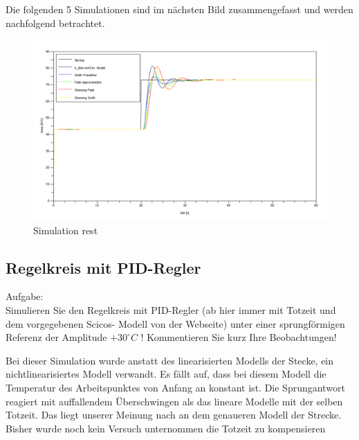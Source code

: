     \vspace{3em}
    
    Die folgenden 5 Simulationen sind im nächsten Bild zusammengefasst und werden nachfolgend betrachtet.
    
    \begin{figure}[H]
    \centering
        \includegraphics[scale=0.4, trim = 0cm 0cm 0cm 0cm, clip]{./Bilder/4_2_Simulation_rest}
            \caption{Simulation rest}
    \end{figure}
    
        
    \subsection{Regelkreis mit PID-Regler}
    Aufgabe:\\
    Simulieren Sie den Regelkreis mit PID-Regler (ab hier immer mit Totzeit und dem vorgegebenen Scicos- Modell von der
    Webseite) unter einer sprungförmigen Referenz der Amplitude $+30^{\circ}C$ ! Kommentieren Sie kurz Ihre
    Beobachtungen!\vspace{1em}
    
        
        Bei dieser Simulation wurde anstatt des linearisierten Modells der Stecke, ein nichtlinearisiertes Modell
        verwandt. Es fällt auf, dass bei diesem Modell die Temperatur des Arbeitspunktes von Anfang an konstant ist. Die
        Sprungantwort reagiert mit auffallendem Überschwingen als das lineare Modelle mit der selben
        Totzeit. Das liegt unserer Meinung nach an dem genaueren Modell der Strecke. Bisher wurde noch kein Versuch
        unternommen die Totzeit zu kompensieren\\
        \vspace{1em}
        
